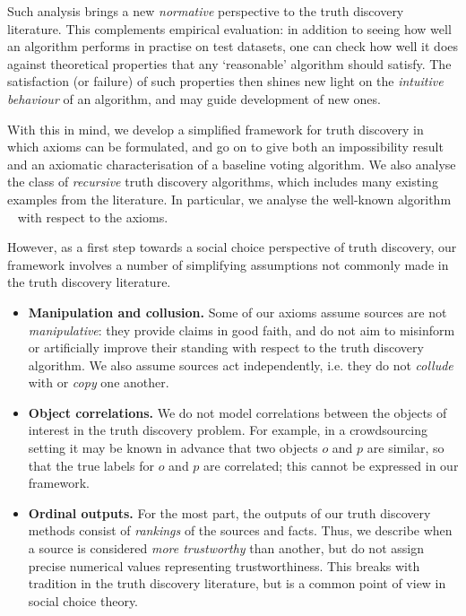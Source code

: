 Such analysis brings a new \emph{normative} perspective to the truth discovery
literature. This complements empirical evaluation: in addition to seeing how well
an algorithm performs in practise on test datasets, one can check how well it
does against theoretical properties that any `reasonable' algorithm should
satisfy. The satisfaction (or failure) of such properties then shines new light
on the \emph{intuitive behaviour} of an algorithm, and may guide development of
new ones.

With this in mind, we develop a simplified framework for truth discovery in which
axioms can be formulated, and go on to give both an impossibility result and an
axiomatic characterisation of a baseline voting algorithm. We also analyse the
class of \emph{recursive} truth discovery algorithms, which includes many
existing examples from the literature. In particular, we analyse the well-known
algorithm \sums{}~\cite{pasternack2010} with respect to the axioms.

However, as a first step towards a social choice perspective of truth
discovery, our framework involves a number of simplifying assumptions not
commonly made in the truth discovery literature.

\begin{itemize}

    \item \textbf{Manipulation and collusion.} Some of our axioms assume
          sources are not \emph{manipulative}: they provide claims in good
          faith, and do not aim to misinform or artificially improve their
          standing with respect to the truth discovery algorithm. We also
          assume sources act independently, i.e. they do not \emph{collude}
          with or \emph{copy} one another.

    \item \textbf{Object correlations.} We do not model correlations between
          the objects of interest in the truth discovery problem. For example,
          in a crowdsourcing setting it may be known in advance that two
          objects $o$ and $p$ are similar, so that the true labels for
          $o$ and $p$ are correlated; this cannot be expressed in our
          framework.

    \item \textbf{Ordinal outputs.} For the most part, the outputs of our truth
          discovery methods consist of \emph{rankings} of the sources and
          facts. Thus, we describe when a source is considered \emph{more
          trustworthy} than another, but do not assign precise numerical values
          representing trustworthiness. This breaks with tradition in the truth
          discovery literature, but is a common point of view in social choice
          theory.

\end{itemize}

